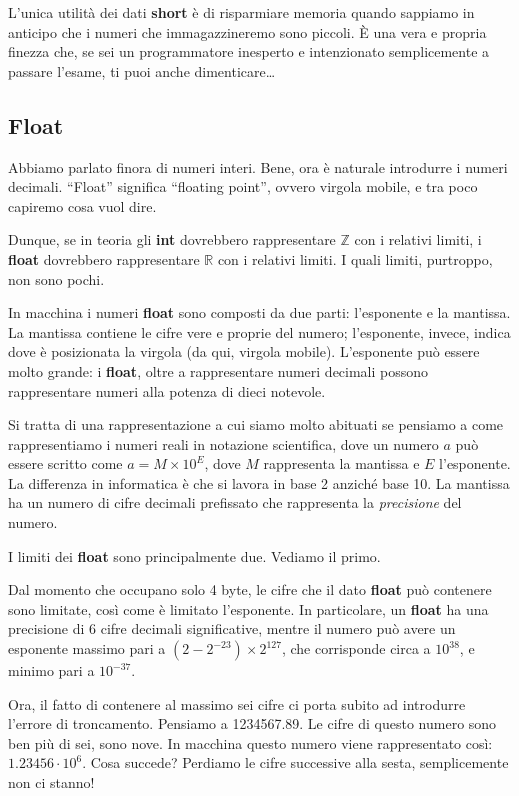 	L'unica utilità dei dati \textbf{short} è di risparmiare memoria quando sappiamo in anticipo che i numeri che immagazzineremo sono piccoli. \`E una vera e propria finezza che, se sei un programmatore inesperto e intenzionato semplicemente a passare l'esame, ti puoi anche dimenticare\ldots
	
	
	
	\subsection{Float}
	Abbiamo parlato finora di numeri interi. Bene, ora è naturale introdurre i numeri decimali. ``Float'' significa ``floating point'', ovvero virgola mobile, e tra poco capiremo cosa vuol dire.
	
	Dunque, se in teoria gli \textbf{int} dovrebbero rappresentare $\mathbb{Z}$ con i relativi limiti, i \textbf{float} dovrebbero rappresentare $\mathbb{R}$ con i relativi limiti. I quali limiti, purtroppo, non sono pochi. 
	
	In macchina i numeri \textbf{float} sono composti da due parti: l'esponente e la mantissa. La mantissa contiene le cifre vere e proprie del numero; l'esponente, invece, indica dove è posizionata la virgola (da qui, virgola mobile). L'esponente può essere molto grande: i \textbf{float}, oltre a rappresentare numeri decimali possono rappresentare numeri alla potenza di dieci notevole.
	
	Si tratta di una rappresentazione a cui siamo molto abituati se pensiamo a come rappresentiamo i numeri reali in notazione scientifica, dove un numero $a$ può essere scritto come $a = M \times 10^E$, dove $M$ rappresenta la mantissa e $E$ l'esponente. La differenza in informatica è che si lavora in base 2 anziché base 10. La mantissa ha un numero di cifre decimali prefissato che rappresenta la \emph{precisione} del numero.
	
	I limiti dei \textbf{float} sono principalmente due. Vediamo il primo.
	
	Dal momento che occupano solo 4 byte, le cifre che il dato \textbf{float} può contenere sono limitate, così come è limitato l'esponente. In particolare, un \textbf{float} ha una precisione di 6 cifre decimali significative, mentre il numero può avere un esponente massimo pari a $(2 − 2^{−23}) \times 2^{127}$, che corrisponde circa a $10^{38}$, e minimo pari a $10^{-37}$.
	
	Ora, il fatto di contenere al massimo sei cifre ci porta subito ad introdurre l'errore di troncamento. Pensiamo a 1234567.89. Le cifre di questo numero sono ben più di sei, sono nove. In macchina questo numero viene rappresentato così: $1.23456\cdotp10^6$. Cosa succede? Perdiamo le cifre successive alla sesta, semplicemente non ci stanno! %
	
